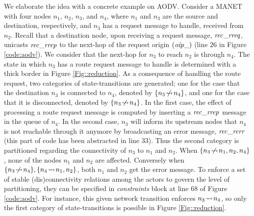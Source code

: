 We elaborate the idea with a concrete example on AODV. Consider a MANET with four nodes $n_1$, $n_2$, $n_3$, and $n_4$, where $n_1$ and $n_3$ are the source and destination, respectively, and $n_3$ has a request message to handle, received from $n_2$. Recall that a destination node, upon receiving a request message, ${\it rec\_rreq}$, unicasts ${\it rec\_rrep}$ to the next-hop of the request origin $({\it oip\_})$ (line $26$ in Figure \ref{code:aodv}). We consider that the next-hop for $n_3$ to reach $n_2$ is through $n_4$. The state in which $n_3$ has a route request message to handle is determined with a thick border in Figure \ref{Fig::reduction}. As a consequence of handling the route request, two categories of state-transitions are generated; one for the case that the destination $n_3$ is connected to $n_4$, denoted by $\{n_3\!\mathrel{\hspace{.1em}\not\hspace{-.1em}\rightsquigarrow}\! n_4\}$, and one for the case that it is disconnected, denoted by $\{n_3\!\mathrel{\hspace{.1em}\not\hspace{-.1em}\rightsquigarrow}\! n_4\}$. In the first case, %
the effect of processing a route request message is computed by inserting a ${\it rec\_rrep}$ message in the queue of $n_4$. In the second case, $n_3$ will inform its upstream nodes that $n_4$ is not reachable through it anymore by broadcasting an error message, ${\it rec\_rerr}$ (this part of code has been abstracted in line $33$). %
Thus the second category is partitioned regarding the connectivity of $n_3$ to $n_1$ and $n_2$. When $\{n_3\!\mathrel{\hspace{.1em}\not\hspace{-.1em}\rightsquigarrow}\! n_1,n_2,n_4\}$, %
none of the nodes $n_1$ and $n_2$ are affected. Conversely when $\{n_3\!\mathrel{\hspace{.1em}\not\hspace{-.1em}\rightsquigarrow}\! n_4\},\{n_4\!\rightsquigarrow\! n_1,n_2\}$, %
both $n_1$ and $n_2$ get the error message. To enforce a set of stable (dis)connectivity relations among the actors to govern the level of partitioning, they can be specified in \emph{constraints} block at line $68$ of Figure \ref{code:aodv}. For instance, this given network transition enforces $n_3\!\rightsquigarrow\! n_4$, so only the first category of state-transitions is possible in Figure \ref{Fig::reduction}. 

